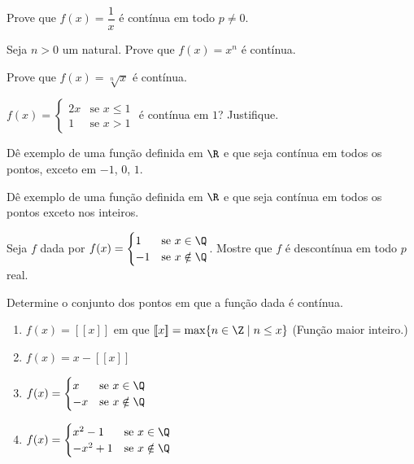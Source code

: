 \begin{exercicio}[2]
Prove que $f(x) = \dfrac{1}{x}$ é contínua em todo $p \neq 0$.
\end{exercicio}

\begin{exercicio}[3]
Seja $n > 0$ um natural. Prove que $f(x) = x^n$ é contínua.
\end{exercicio}

\begin{exercicio}[4]
Prove que $f(x) = \sqrt[n]{x}$ é contínua.
\end{exercicio}

\begin{exercicio}[5]
$f(x) = \begin{cases} 2x & \text{se } x \le 1 \\ 1 & \text{se } x > 1 \end{cases}$ é contínua em $1$? Justifique.
\end{exercicio}

\begin{exercicio}[6]
Dê exemplo de uma função definida em $\R$ e que seja contínua em todos os pontos, exceto em $-1$, $0$, $1$.
\end{exercicio}

\begin{exercicio}[7]
Dê exemplo de uma função definida em $\R$ e que seja contínua em todos os pontos exceto nos inteiros.
\end{exercicio}

\begin{exercicio}[8]
Seja $f$ dada por $f(x) = \begin{cases} 1 & \text{se } x \in \Q \\ -1 & \text{se } x \notin \Q \end{cases}$. Mostre que $f$ é descontínua em todo $p$ real.
\end{exercicio}

\begin{exercicio}[9]
Determine o conjunto dos pontos em que a função dada é contínua.
\begin{enumerate}[label=\alph*)]
    \item $f(x) = [\![x]\!]$ em que $[\![x]\!] = \max\{n \in \Z \mid n \le x\}$ (Função maior inteiro.)
    \item $f(x) = x - [\![x]\!]$
    \item $f(x) = \begin{cases} x & \text{se } x \in \Q \\ -x & \text{se } x \notin \Q \end{cases}$
    \item $f(x) = \begin{cases} x^2 - 1 & \text{se } x \in \Q \\ -x^2 + 1 & \text{se } x \notin \Q \end{cases}$
\end{enumerate}
\end{exercicio}

